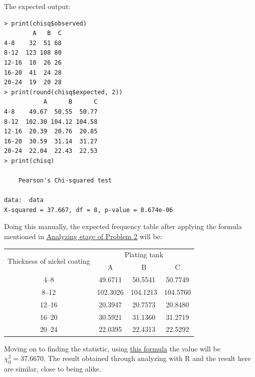 \documentclass[a4paper]{article}
\numberwithin{equation}{section}
\begin{document}
The expected output:
\begin{mdframed}[leftline=false,rightline=false,backgroundcolor=magenta!10,nobreak=true]
  \begin{verbatim}
> print(chisq$observed)
        A   B  C
4-8    32  51 68
8-12  123 108 80
12-16  10  26 26
16-20  41  24 28
20-24  19  20 28
> print(round(chisq$expected, 2))
           A      B      C
4-8    49.67  50.55  50.77
8-12  102.30 104.12 104.58
12-16  20.39  20.76  20.85
16-20  30.59  31.14  31.27
20-24  22.04  22.43  22.53
> print(chisq)

	Pearson's Chi-squared test

data:  data
X-squared = 37.667, df = 8, p-value = 8.674e-06
  \end{verbatim}
\end{mdframed}

Doing this manually, the expected frequency table after applying the formula mentioned in \hyperref[p2:anal]{\underline{Analyzing stage of Problem 2}} will be:

\begin{center}
  \begin{tabular}{cccc}
    \toprule
    \multirow{2}{*}{Thickness of nickel coating} & \multicolumn{3}{c}{Plating tank}                       \\
    \cmidrule(lr){2-4}
                                                 & A                                & B        & C        \\
    \midrule
    4--8                                         & 49.6711                          & 50.5541  & 50.7749  \\
    8--12                                        & 102.3026                         & 104.1213 & 104.5760 \\
    12--16                                       & 20.3947                          & 20.7573  & 20.8480  \\
    16--20                                       & 30.5921                          & 31.1360  & 31.2719  \\
    20--24                                       & 22.0395                          & 22.4313  & 22.5292  \\
    \bottomrule
  \end{tabular}
\end{center}

Moving on to finding the statistic, using \hyperref[chi:stat]{\underline{this formula}} the value will be \( \chi_0^2 = 37.6670\). The result obtained through analyzing with R and the result here are similar, close to being alike.
\end{document}
